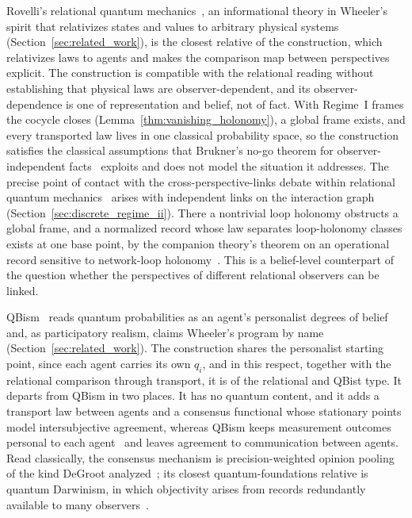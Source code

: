 Rovelli's relational quantum mechanics~\cite{Rovelli1996}, an informational theory in Wheeler's spirit that relativizes states and values to arbitrary physical systems (Section~\ref{sec:related_work}), is the closest relative of the construction, which relativizes laws to agents and makes the comparison map between perspectives explicit. The construction is compatible with the relational reading without establishing that physical laws are observer-dependent, and its observer-dependence is one of representation and belief, not of fact. With Regime~I frames the cocycle closes (Lemma~\ref{thm:vanishing_holonomy}), a global frame exists, and every transported law lives in one classical probability space, so the construction satisfies the classical assumptions that Brukner's no-go theorem for observer-independent facts~\cite{Brukner2018} exploits and does not model the situation it addresses. The precise point of contact with the cross-perspective-links debate within relational quantum mechanics~\cite{AdlamRovelli2022} arises with independent links on the interaction graph (Section~\ref{sec:discrete_regime_ii}). There a nontrivial loop holonomy obstructs a global frame, and a normalized record whose law separates loop-holonomy classes exists at one base point, by the companion theory's theorem on an operational record sensitive to network-loop holonomy~\cite[Ch.~10]{DennisGaugeVFE2026}. This is a belief-level counterpart of the question whether the perspectives of different relational observers can be linked.

QBism~\cite{Fuchs2014, Fuchs2017} reads quantum probabilities as an agent's personalist degrees of belief and, as participatory realism, claims Wheeler's program by name (Section~\ref{sec:related_work}). The construction shares the personalist starting point, since each agent carries its own $q_i$, and in this respect, together with the relational comparison through transport, it is of the relational and QBist type. It departs from QBism in two places. It has no quantum content, and it adds a transport law between agents and a consensus functional whose stationary points model intersubjective agreement, whereas QBism keeps measurement outcomes personal to each agent~\cite{DeBrotaFuchsSchack2020} and leaves agreement to communication between agents. Read classically, the consensus mechanism is precision-weighted opinion pooling of the kind DeGroot analyzed~\cite{degroot1974}; its closest quantum-foundations relative is quantum Darwinism, in which objectivity arises from records redundantly available to many observers~\cite{Zurek2009}.

